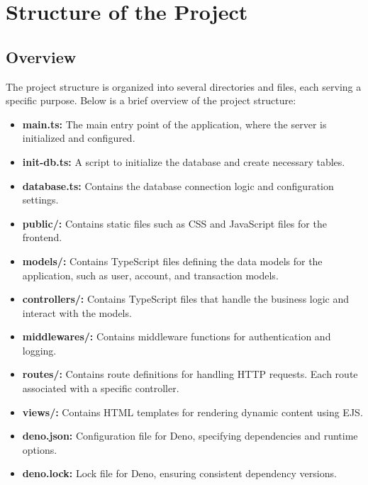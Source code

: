 \section{Structure of the Project}
\subsection{Overview}
The project structure is organized into several directories and
files, each serving a
specific purpose. Below is a brief overview of the project structure:
\begin{itemize}
  \item \textbf{main.ts:} The main entry point of the application,
    where the server is
    initialized and configured.
  \item \textbf{init-db.ts:} A script to initialize the database and
    create necessary
    tables.
  \item \textbf{database.ts:} Contains the database connection logic
    and configuration
    settings.
  \item \textbf{public/:} Contains static files such as CSS and
    JavaScript files for the
    frontend.
  \item \textbf{models/:} Contains TypeScript files defining the data
    models for the
    application, such as user, account, and transaction models.
  \item \textbf{controllers/:} Contains TypeScript files that handle
    the business logic
    and interact with the models.
  \item \textbf{middlewares/:} Contains middleware functions for
    authentication and
    logging.
  \item \textbf{routes/:} Contains route definitions for handling HTTP
    requests. Each route associated with a specific controller.
  \item \textbf{views/:} Contains HTML templates for rendering
    dynamic content using EJS.
  \item \textbf{deno.json:} Configuration file for Deno, specifying
    dependencies and
    runtime options.
  \item \textbf{deno.lock:} Lock file for Deno, ensuring consistent
    dependency versions.
\end{itemize}

\vspace{3cm}

